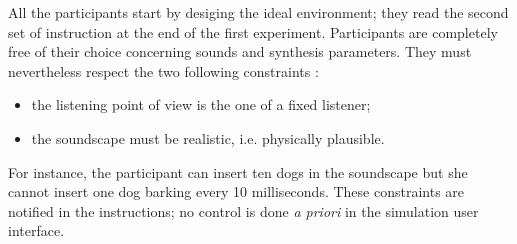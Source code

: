 \documentclass[twoside,twocolumn]{article}
\begin{document}
All the participants start by desiging the ideal environment; they read the second set of instruction at the end of the first experiment. Participants are completely free of their choice concerning sounds and synthesis parameters. They must nevertheless respect the two following constraints :
\begin{itemize}
\item the listening point of view is the one of a fixed listener;
\item the soundscape must be realistic, i.e. physically plausible.
\end{itemize}
For instance, the participant can insert ten dogs in the soundscape but she cannot insert one dog barking every 10 milliseconds.
These constraints are notified in the instructions; no control is done \emph{a priori} in the simulation user interface.


%
%
%
%
\end{document}

